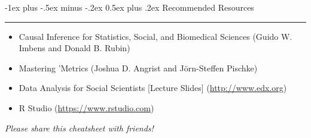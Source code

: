 \documentclass[a4paper,10pt,landscape]{article}
\makeatletter
\renewcommand{\section}{\@startsection{section}{1}{0mm}%
                                {-1ex plus -.5ex minus -.2ex}%
                                {0.5ex plus .2ex}%
                                {\normalfont\large\bfseries}}
\makeatother
\begin{document}
\begin{multicols*}{3}
\section{Recommended Resources} \smallskip \hrule height 1pt \smallskip

\bigskip

\begin{itemize}
\item Causal Inference for Statistics, Social, and Biomedical Sciences (Guido W. Imbens and Donald B. Rubin)
\item Mastering 'Metrics (Joshua D. Angrist and J\"orn-Steffen Pischke)
\item Data Analysis for Social Scientists [Lecture Slides] (\url{http://www.edx.org})
\item R Studio (\url{https://www.rstudio.com})
\end{itemize}

\begin{center}\emph{Please share this cheatsheet with friends!}\end{center}

\end{multicols*}

\newpage
\end{document}

